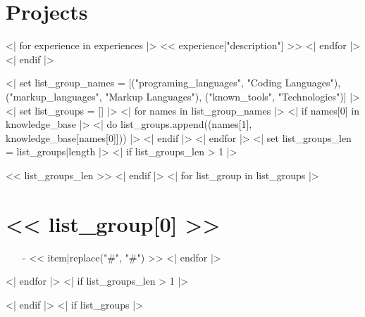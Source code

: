 \documentclass[10pt, letterpaper]{article}
\begin{document}
        \section{Projects}
        <| for experience in experiences |> %
            {
                \let\olditb\itemize
                \let\oldite\enditemize
                \renewenvironment{itemize}{%
                    \begin{multicols}{2}%
                    \begingroup \olditb%
                }{%
                    \oldite \endgroup%
                    \end{multicols}%
                }
                \setlength{\multicolsep}{1pt}%
                \setlength{\parskip}{1pt}%
                << experience["description"] >>%
            }
        <| endfor |>
        \vfill
    <| endif |>
    
    <| set list_group_names = [("programing_languages", "Coding Languages"),
                               ("markup_languages", "Markup Languages"),
                               ("known_tools", "Technologies")] |>
    <| set list_groups = [] |>
    <| for names in list_group_names |>
        <| if names[0] in knowledge_base |>
            <| do list_groups.append((names[1], knowledge_base[names[0]])) |>
        <| endif |>
    <| endfor |>
    <| set list_groups_len = list_groups|length |>
    <| if list_groups_len > 1 |>
        \begin{multicols}{<< list_groups_len >>}
        \raggedcolumns
    <| endif |>
    <| for list_group in list_groups |>
        \section{<< list_group[0] >>}
        \parbox{\columnwidth}{
            \begin{itemize}
                <| for item in list_group[1] |>
                    \item[-] << item|replace("#", "\#") >>
                <| endfor |>
            \end{itemize}\vfill
        }\columnbreak
    <| endfor |>
    <| if list_groups_len > 1 |>
        \end{multicols}
    <| endif |>
    <| if list_groups |>
    \vfill\vfill\vfill
    
\end{document}
